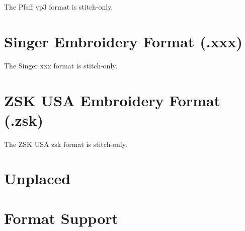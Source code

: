 The Pfaff vp3 format is stitch-only.

\section{Singer Embroidery Format (.xxx)}

The Singer xxx format is stitch-only.

\section{ZSK USA Embroidery Format (.zsk)}

The ZSK USA zsk format is stitch-only.

\section{Unplaced}


\section{Format Support}


